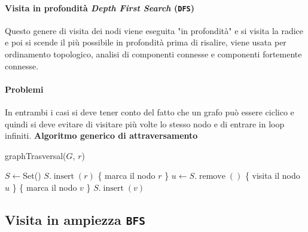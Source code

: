     \paragraph{Visita in profondità \textit{Depth First Search} (\texttt{DFS})} Questo genere di visita dei nodi viene eseguita "in profondità" e si visita la radice e poi si scende il più possibile in profondità prima di risalire, viene usata per ordinamento topologico, analisi di componenti connesse e componenti fortemente connesse.
    \paragraph{Problemi} In entrambi i casi si deve tener conto del fatto che un grafo può essere ciclico e quindi si deve evitare di visitare più volte lo stesso nodo e di entrare in loop infiniti.\newline
    \textbf{Algoritmo generico di attraversamento}
    \begin{algorithm}
        \caption{graphTrasversal(\Graph $G$, \Node $r$)}
        \begin{algorithmic}
            \State $ S \gets $Set()
            \State $ S.\operatorname{insert}(r) $
            \State \{ marca il nodo $ r $ \}
                \State \Node $u \gets S.\operatorname{remove}()$
                \{ visita il nodo $ u $ \}
                        \{ marca il nodo $ v $ \}
                        \State $ S.\operatorname{insert}(v) $
                    \EndIf
                \EndFor
            \EndWhile
        \end{algorithmic}
    \end{algorithm}
    \subsection{Visita in ampiezza \texttt{BFS}}

